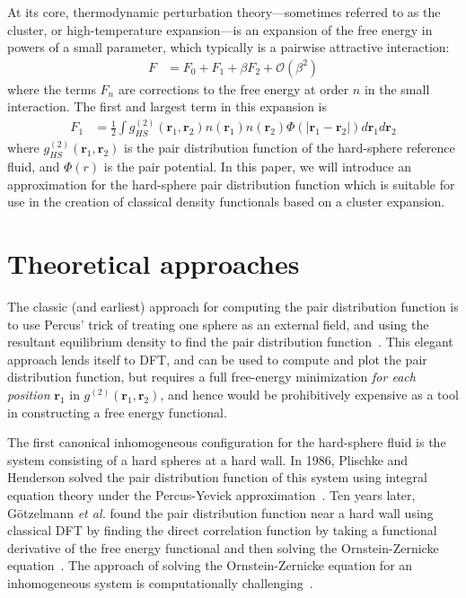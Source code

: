 \documentclass[letterpaper,twocolumn,amsmath,amssymb,pre]{revtex4-1}
\newcommand{\rr}{\textbf{r}}
\begin{document}
At its core, thermodynamic perturbation theory---sometimes referred to
as the cluster, or high-temperature expansion---is an expansion of the
free energy in powers of a small parameter, which typically is a
pairwise attractive interaction:
\begin{align}
  F &= F_0 + F_1 + \beta F_2 + \mathcal{O}(\beta^2)
\end{align}
where the terms $F_n$ are corrections to the free energy at order $n$
in the small interaction.  The first and largest term in this
expansion is
\begin{align}
  F_1 &= \tfrac12 \int g^{(2)}_{HS}(\rr_1,\rr_2)n(\rr_1)n(\rr_2)\Phi(|\rr_1-\rr_2|) d\rr_1d\rr_2
\end{align}
where $g^{(2)}_{HS}(\rr_1,\rr_2)$ is the pair distribution function of
the hard-sphere reference fluid, and $\Phi(r)$ is the pair potential.
In this paper, we will introduce an approximation for the hard-sphere
pair distribution function which is suitable for use in the creation
of classical density functionals based on a cluster expansion.

\section{Theoretical approaches}

The classic (and earliest) approach for computing the pair
distribution function is to use Percus' trick of treating one sphere
as an external field, and using the resultant equilibrium density to
find the pair distribution function~\cite{hansen2006theory}.  This
elegant approach lends itself to DFT, and can be used to compute and
plot the pair distribution function, but requires a full free-energy
minimization \emph{for each position} $\rr_1$ in
$g^{(2)}(\rr_1,\rr_2)$, and hence would be prohibitively expensive as
a tool in constructing a free energy functional.

The first canonical inhomogeneous configuration for the hard-sphere
fluid is the system consisting of a hard spheres at a hard wall.  In
1986, Plischke and Henderson solved the pair distribution function of
this system using integral equation theory under the Percus-Yevick
approximation~\cite{plischke1986pair}.  Ten years later,
G{\"o}tzelmann \emph{et al.} found the pair distribution function near
a hard wall using classical DFT by finding the direct correlation
function by taking a functional derivative of the free energy
functional and then solving the Ornstein-Zernicke
equation~\cite{gotzelmann1996structure}.  The approach of solving the
Ornstein-Zernicke equation for an inhomogeneous system is
computationally challenging~\cite{paul2003variational}.
\end{document}
